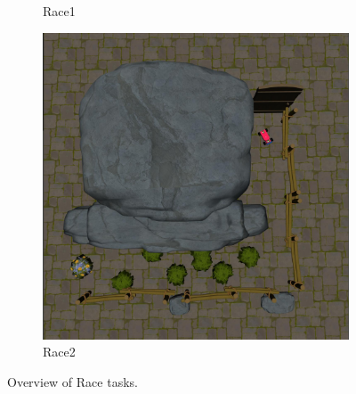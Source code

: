 \documentclass{article}
\begin{document}
\begin{figure}[H]
\begin{subfigure}{0.3\linewidth}
        \caption{Race1}
      \end{subfigure}
      \begin{subfigure}{0.3\linewidth}
        \centering
        \includegraphics[width=\linewidth]{assets/appendix/race2.pdf}
        \caption{Race2}
      \end{subfigure}
      \caption{Overview of Race tasks.}
\end{figure}




\end{document}
